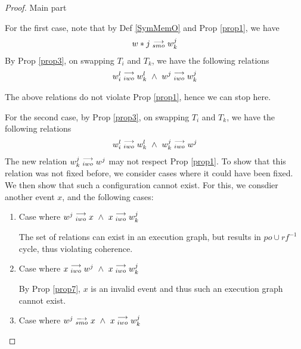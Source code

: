 \begin{proof}{Main part}
\begin{itemize}
                        For the first case, note that by Def \ref{SymMemO} and Prop \ref{prop1}, we have 
                        \begin{align*}
                            w*j\stackrel{\longrightarrow}{_{smo}}w_k^j
                        \end{align*}
                        By Prop \ref{prop3}, on swapping $T_i$ and $T_k$, we have the following relations 
                        \begin{align*}
                            \reln{w_i^l}{iwo}{w_k^l} \ \wedge \ \reln{w^j}{iwo}{w_k^j}
                        \end{align*}

                        The above relations do not violate Prop \ref{prop1}, hence we can stop here. 

                        For the second case, by Prop \ref{prop3}, on swapping $T_i$ and $T_k$, we have the following relations 
                        \begin{align*}
                            \reln{w_i^l}{iwo}{w_k^l} \ \wedge \ \reln{w_k^j}{iwo}{w^j}
                        \end{align*}
                        The new relation $w_k^j\stackrel{\longrightarrow}{_{iwo}}w^j$ may not respect Prop \ref{prop1}. 
                        To show that this relation was not fixed before, we consider cases where it could have been fixed. We then show that such a configuration cannot exist. For this, we consdier another event $x$, and the following cases:
                        
                        \begin{enumerate}
                            \item Case where $w^j\stackrel{\longrightarrow}{_{iwo}}x \ \wedge \ x\stackrel{\longrightarrow}{_{iwo}}w_k^j$
                            
                                The set of relations can exist in an execution graph, but results in $po \cup rf^{-1}$ cycle, thus violating coherence. 
                            
                            \item Case where $x\stackrel{\longrightarrow}{_{iwo}}w^j \ \wedge \ x\stackrel{\longrightarrow}{_{iwo}}w_k^j$
                            
                                By Prop \ref{prop7}, $x$ is an invalid event and thus such an execution graph cannot exist.
                            
                            \item Case where $w^j\stackrel{\longrightarrow}{_{smo}}x \ \wedge \ x\stackrel{\longrightarrow}{_{iwo}}w_k^j$
                                

\end{enumerate}
\end{itemize}
\end{proof}

